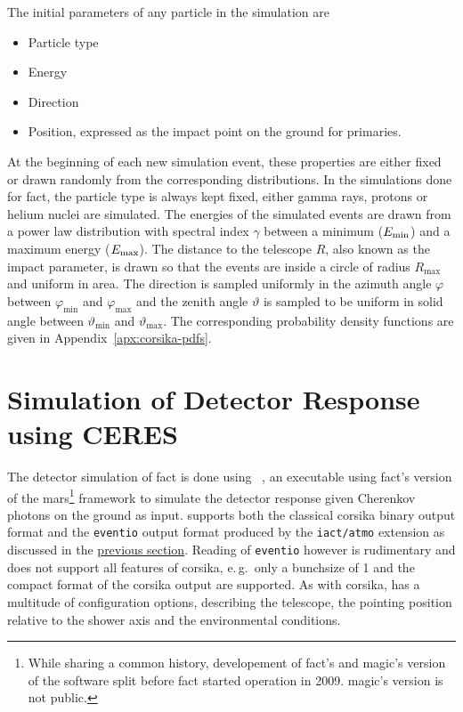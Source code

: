 The initial parameters of any particle in the simulation are
\begin{itemize}[nosep]
  \item Particle type
  \item Energy
  \item Direction
  \item Position, expressed as the impact point on the ground for primaries.
\end{itemize}
At the beginning of each new simulation event, these properties are either
fixed or drawn randomly from the corresponding distributions.
In the simulations done for \gls{fact}, the particle type
is always kept fixed, either gamma rays, protons or helium nuclei are simulated.
The energies of the simulated events are drawn from a power law distribution with
spectral index $\gamma$ between a minimum ($\Emin$) and a maximum energy ($\Emax$).
The distance to the telescope $R$, also known as the impact parameter,
is drawn so that the events are inside a circle of radius $R_{\max}$ and uniform in area.
The direction is sampled uniformly in the azimuth angle $φ$ between $φ_{\min}$ and
$φ_{\max}$
and the zenith angle $ϑ$ is sampled to be uniform in solid angle between $ϑ_{\min}$
and $ϑ_{\max}$.
The corresponding probability density functions are given in Appendix~\ref{apx:corsika-pdfs}.

\section{Simulation of Detector Response using CERES}\label{sec:ceres}

The detector simulation of \gls{fact} is done using \ceres{}~\cite{ceres}, an executable
using \gls{fact}'s version of the \gls{mars}\footnote{While sharing a common history, developement of \gls{fact}'s and \gls{magic}'s version of the software split before \gls{fact} started operation in 2009. \gls{magic}'s version is not public.} framework to simulate the detector response
given Cherenkov photons on the ground as input.
\ceres{} supports both the classical \gls{corsika} binary output format and the \texttt{eventio}
output format produced by the \texttt{iact/atmo} extension as discussed in the \hyperref[sec:corsika]{previous section}. 
Reading of \texttt{eventio} however is rudimentary and does not support all features
of \gls{corsika}, e.\,g.\ only a bunchsize of 1 and the compact format of the \gls{corsika}
output are supported.
As with \gls{corsika}, \ceres{} has a multitude of configuration options,
describing the telescope, the pointing position relative to the shower axis and the environmental conditions.

